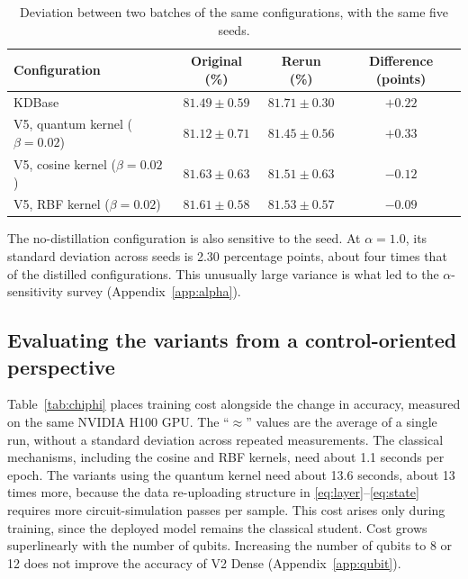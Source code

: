 \begin{table}[!htbp]
\centering
\caption{Deviation between two batches of the same configurations, with
the same five seeds.}
\label{tab:taplap}
\begin{tabular}{lccc}
\toprule
\textbf{Configuration} & \textbf{Original (\%)} & \textbf{Rerun (\%)} & \textbf{Difference (points)} \\
\midrule
KDBase & $81.49 \pm 0.59$ & $81.71 \pm 0.30$ & $+0.22$ \\
V5, quantum kernel ($\beta = 0.02$) & $81.12 \pm 0.71$ & $81.45 \pm 0.56$ & $+0.33$ \\
V5, cosine kernel ($\beta = 0.02$) & $81.63 \pm 0.63$ & $81.51 \pm 0.63$ & $-0.12$ \\
V5, RBF kernel ($\beta = 0.02$) & $81.61 \pm 0.58$ & $81.53 \pm 0.57$ & $-0.09$ \\
\bottomrule
\end{tabular}
\end{table}
\FloatBarrier

The no-distillation configuration is also sensitive to the seed. At
$\alpha = 1.0$, its standard deviation across seeds is 2.30 percentage
points, about four times that of the distilled configurations. This
unusually large variance is what led to the $\alpha$-sensitivity survey
(Appendix~\ref{app:alpha}).

\subsection{Evaluating the variants from a control-oriented perspective}
\label{sec:danhgiadk}

Table~\ref{tab:chiphi} places training cost alongside the change in
accuracy, measured on the same NVIDIA H100 GPU. The ``$\approx$''
values are the average of a single run, without a standard deviation
across repeated measurements. The classical mechanisms, including the
cosine and RBF kernels, need about 1.1 seconds per epoch. The variants
using the quantum kernel need about 13.6 seconds, about 13 times more,
because the data re-uploading structure in
\eqref{eq:layer}--\eqref{eq:state} requires more circuit-simulation
passes per sample. This cost arises only during training, since the
deployed model remains the classical student. Cost grows superlinearly
with the number of qubits. Increasing the number of qubits to 8 or 12
does not improve the accuracy of V2 Dense (Appendix~\ref{app:qubit}).

